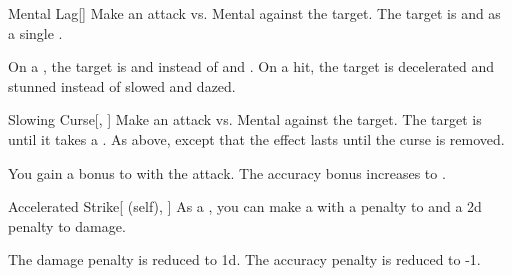 \lowercase{\hypertarget{spell:Mental Lag}{}}\label{spell:Mental Lag}
\begin{freeability}[Rank 3]{\hypertarget{spell:Mental Lag}{Mental Lag}}[]
Make an attack vs. Mental against the target.
\hit The target is  and  as a single .

\rankline
{} On a , the target is  and  instead of  and .
 On a hit, the target is decelerated and stunned instead of slowed and dazed.
\end{freeability}
\vspace{0.25em}



\lowercase{\hypertarget{spell:Slowing Curse}{}}\label{spell:Slowing Curse}
\begin{freeability}[Rank 3]{\hypertarget{spell:Slowing Curse}{Slowing Curse}}[, ]
Make an attack vs. Mental against the target.
\hit The target is  until it takes a .
\crit As above, except that the effect lasts until the curse is removed.

\rankline
{} You gain a  bonus to  with the attack.
 The accuracy bonus increases to .
\end{freeability}
\vspace{0.25em}



\lowercase{\hypertarget{spell:Accelerated Strike}{}}\label{spell:Accelerated Strike}
\begin{attuneability}[Rank 4]{\hypertarget{spell:Accelerated Strike}{Accelerated Strike}}[ (self), ]
As a , you can make a  with a  penalty to  and a \minus2d penalty to damage.

\rankline
{} The damage penalty is reduced to \minus1d.
 The accuracy penalty is reduced to -1.
\end{attuneability}
\vspace{0.25em}



